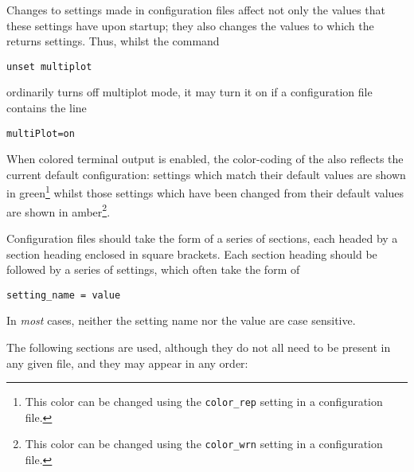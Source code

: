 Changes to settings made in configuration files affect not only the values that
these settings have upon startup; they also changes the values to which the
 returns settings. Thus, whilst the command
\begin{verbatim}
unset multiplot
\end{verbatim}
ordinarily turns off multiplot mode, it may turn it on if a configuration file
contains the line
\begin{verbatim}
multiPlot=on
\end{verbatim}
When colored terminal output is enabled, the color-coding of the
 also reflects the current default configuration: settings which
match their default values are shown in green\footnote{This color can be
changed using the {\tt color\_rep} setting in a configuration file.} whilst
those settings which have been changed from their default values are shown in
amber\footnote{This color can be changed using the {\tt color\_wrn} setting
in a configuration file.}.

Configuration files should take the form of a series of sections, each headed
by a section heading enclosed in square brackets. Each section heading should
be followed by a series of settings, which often take the form of
\begin{verbatim}
setting_name = value
\end{verbatim}
In {\it most} cases, neither the setting name nor the value are case sensitive.

The following sections are used, although they do not all need to be present in
any given file, and they may appear in any order:


